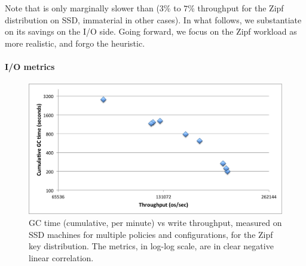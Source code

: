 Note that \adp\/ is only marginally slower than \basic\/ ($3$\% to $7$\% throughput for the Zipf 
distribution on SSD, immaterial in other cases).  In what follows, we substantiate on its savings 
on the I/O side. Going forward, we focus on the Zipf workload as more realistic, and 
forgo the \eager\/ heuristic. 

\paragraph{I/O metrics}

\begin{figure}[htb]
\includegraphics[width=\figw]{Figs/gc-throughput-log2.png}
\caption{GC time (cumulative, per minute) vs write throughput, measured on SSD machines 
for multiple \sys\/ policies and configurations, for the Zipf  key distribution. The metrics, in log-log scale, 
are in clear negative linear correlation. 
}
\label{fig:gc-throughput-log2}
\end{figure}

